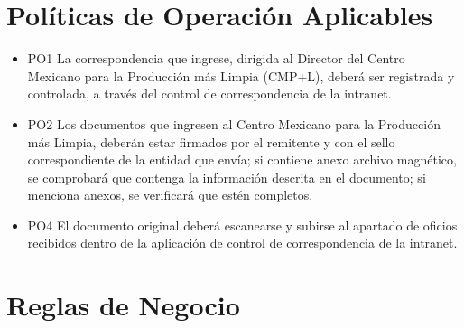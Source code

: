 \section{Políticas de Operación Aplicables}

\begin{itemize}
	\item PO1 La correspondencia que ingrese, dirigida al Director del Centro Mexicano para la Producción más Limpia (CMP+L), deberá ser registrada y controlada, a través del control de correspondencia de la intranet.
	\item PO2 Los documentos que ingresen al Centro Mexicano para la Producción más Limpia, deberán estar firmados por el remitente y con el sello correspondiente de la entidad que envía; si contiene anexo archivo magnético, se comprobará que contenga la información descrita en el documento; si menciona anexos, se verificará que estén completos.
	\item PO4 El documento original deberá escanearse y subirse al apartado de oficios recibidos dentro de la aplicación de control de correspondencia de la intranet.
\end{itemize}

\section{Reglas de Negocio}

